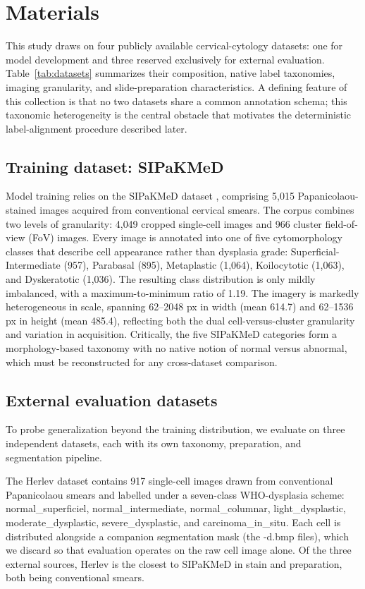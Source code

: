 \section{Materials}

This study draws on four publicly available cervical-cytology datasets: one for model development and three reserved exclusively for external evaluation. Table~\ref{tab:datasets} summarizes their composition, native label taxonomies, imaging granularity, and slide-preparation characteristics. A defining feature of this collection is that no two datasets share a common annotation schema; this taxonomic heterogeneity is the central obstacle that motivates the deterministic label-alignment procedure described later.

\subsection{Training dataset: SIPaKMeD}

Model training relies on the SIPaKMeD dataset \citep{plissiti2018sipakmed}, comprising 5{,}015 Papanicolaou-stained images acquired from conventional cervical smears. The corpus combines two levels of granularity: 4{,}049 cropped single-cell images and 966 cluster field-of-view (FoV) images. Every image is annotated into one of five cytomorphology classes that describe cell appearance rather than dysplasia grade: Superficial-Intermediate (957), Parabasal (895), Metaplastic (1{,}064), Koilocytotic (1{,}063), and Dyskeratotic (1{,}036). The resulting class distribution is only mildly imbalanced, with a maximum-to-minimum ratio of 1.19. The imagery is markedly heterogeneous in scale, spanning 62--2048 px in width (mean 614.7) and 62--1536 px in height (mean 485.4), reflecting both the dual cell-versus-cluster granularity and variation in acquisition. Critically, the five SIPaKMeD categories form a morphology-based taxonomy with no native notion of normal versus abnormal, which must be reconstructed for any cross-dataset comparison.

\subsection{External evaluation datasets}

To probe generalization beyond the training distribution, we evaluate on three independent datasets, each with its own taxonomy, preparation, and segmentation pipeline.

The Herlev dataset \citep{jantzen2005herlev} contains 917 single-cell images drawn from conventional Papanicolaou smears and labelled under a seven-class WHO-dysplasia scheme: normal\_superficiel, normal\_intermediate, normal\_columnar, light\_dysplastic, moderate\_dysplastic, severe\_dysplastic, and carcinoma\_in\_situ. Each cell is distributed alongside a companion segmentation mask (the {-d.bmp} files), which we discard so that evaluation operates on the raw cell image alone. Of the three external sources, Herlev is the closest to SIPaKMeD in stain and preparation, both being conventional smears.

